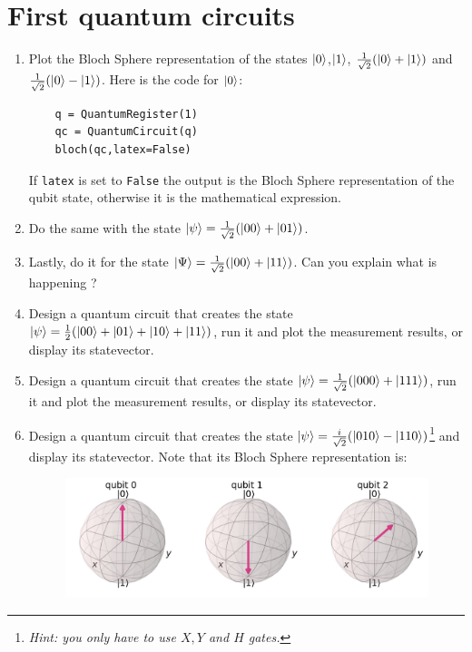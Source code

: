 \documentclass{article}
\begin{document}
\newpage

\section{First quantum circuits}

\begin{enumerate}
    \item Plot the Bloch Sphere representation of the states $\ket{0}$,$\ket{1}$, $\frac{1}{\sqrt{2}}(\ket{0}+\ket{1})$ and $\frac{1}{\sqrt{2}}(\ket{0}-\ket{1})$. Here is the code for $\ket{0}$:
    \begin{verbatim}
    q = QuantumRegister(1)
    qc = QuantumCircuit(q)
    bloch(qc,latex=False)
    \end{verbatim}
    If \verb|latex| is set to \verb|False| the output is the Bloch Sphere representation of the qubit state, otherwise it is the mathematical expression.
    \item Do the same with the state $\ket{\psi}=\frac{1}{\sqrt{2}}(\ket{00}+\ket{01})$. 
    \item Lastly, do it for the state $\ket{\Psi}=\frac{1}{\sqrt{2}}(\ket{00}+\ket{11})$. Can you explain what is happening ?
    \item Design a quantum circuit that creates the state $\ket{\psi}=\frac{1}{2}(\ket{00}+\ket{01}+\ket{10}+\ket{11})$, run it and plot the measurement results, or display its statevector.
    \item Design a quantum circuit that creates the state $\ket{\psi}=\frac{1}{\sqrt{2}}(\ket{000}+\ket{111})$, run it and plot the measurement results, or display its statevector.
     \item Design a quantum circuit that creates the state $\ket{\psi}=\frac{i}{\sqrt{2}}(\ket{010}-\ket{110})$\footnote{\textit{Hint: you only have to use $X,Y$ and $H$ gates.}} and display its statevector. Note that its Bloch Sphere representation is:
     \begin{figure}[H]
         \centering
         \includegraphics[scale=0.35]{bloch3.png}
     \end{figure}

\end{enumerate}
\end{document}
